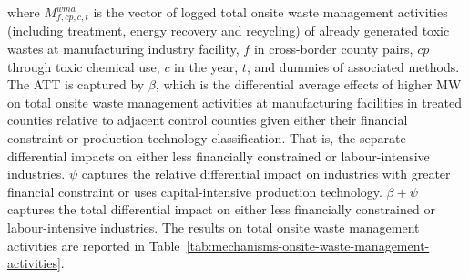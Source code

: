 \documentclass[12pt, english]{article}
\begin{document}
    where $M_{f,cp,c,t}^{wma}$ is the vector of logged total onsite waste management activities (including treatment, energy recovery and recycling) of already generated toxic wastes at manufacturing industry facility, $f$ in cross-border county pairs, $cp$ through toxic chemical use, $c$ in the year, $t$, and dummies of associated methods. The ATT is captured by $\beta$, which is the differential average effects of higher MW on total onsite waste management activities at manufacturing facilities in treated counties relative to adjacent control counties given either their financial constraint or production technology classification. That is, the separate differential impacts on either less financially constrained or labour-intensive industries. $\psi$ captures the relative differential impact on industries with greater financial constraint or uses capital-intensive production technology. $\beta + \psi$ captures the total differential impact on either less financially constrained or labour-intensive industries. The results on total onsite waste management activities are reported in Table~\ref{tab:mechanisms-onsite-waste-management-activities}.
    
\end{document}

